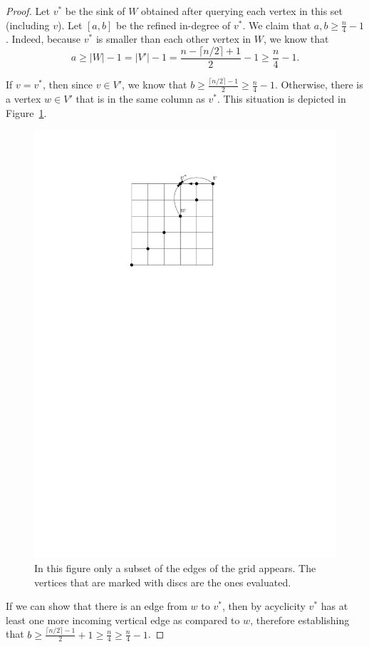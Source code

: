 \documentclass[a4paper,10pt]{article}
\newcommand{\indegree}{refined in-degree\xspace}
\begin{document}
\begin{proof}
Let $v^*$ be the sink of $W$ obtained after querying each vertex in this set (including $v$). Let $[a,b]$ be the \indegree of $v^*$. We claim that $a, b \geq \frac{n}{4} - 1$. 
Indeed, because $v^*$ is smaller than each other vertex in $W$, we know that $$a \geq |W|-1 = |V'|-1 = \frac{n-\lceil n/2\rceil + 1}{2} - 1 \geq \frac{n}{4} - 1.$$


If $v = v^*$, then since $v\in V'$, we know that $b\geq \frac{\lceil n/2\rceil-1}{2}\geq \frac{n}{4} - 1$.
Otherwise, there is a vertex $w \in V'$ that is in the same column as $v^*$.
  This situation is depicted in Figure~\ref{fig:seedlem1}.
  \begin{figure}[htbp] 
  	\centering
  	\includegraphics[scale=0.7]{seedlemma_fig1.pdf}
  	\caption{In this figure only a subset of the edges of the grid appears. The vertices that are marked with discs are the ones evaluated.} 
  	\label{fig:seedlem1}
  \end{figure}
   If we can show that there is an edge from $w$ to $v^*$, then by acyclicity $v^*$ has at least one more incoming vertical edge as compared to $w$, therefore establishing that $b \geq \frac{\lceil n/2\rceil-1}{2} + 1 \geq \frac{n}{4} \geq \frac{n}{4} - 1$. 
   

\end{proof}
\end{document}
